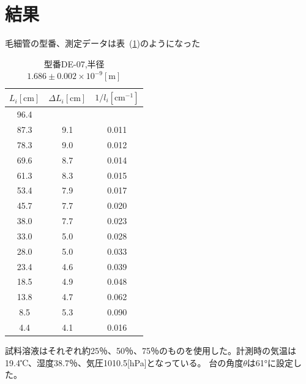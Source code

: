 \documentclass[a4j,10pt]{jarticle}
\newcommand{\Tabref}[1]{表~(\ref{#1})}
\begin{document}
\section{結果}
毛細管の型番、測定データは\Tabref{mousai}のようになった
\begin{table}[h]
\caption{型番DE-07,半径$1.686\pm0.002 \times 10^{-9}[\mathrm m]$}
\label{mousai}
\begin{center}
\begin{tabular}{|c|c|c|}\hline
$L_i\mathrm{[cm]}$ & $\Delta L_i\mathrm{[cm]}$ & $1/l_i\mathrm{[cm^{-1}]}$ \\ \hline \hline
96.4& & \\ \hline
87.3& 9.1& 0.011 \\ \hline
78.3& 9.0& 0.012 \\ \hline
69.6& 8.7& 0.014 \\ \hline
61.3& 8.3& 0.015 \\ \hline
53.4& 7.9& 0.017 \\ \hline
45.7& 7.7& 0.020 \\ \hline
38.0& 7.7& 0.023 \\ \hline
33.0& 5.0& 0.028 \\ \hline
28.0& 5.0& 0.033 \\ \hline
23.4& 4.6& 0.039 \\ \hline
18.5& 4.9& 0.048 \\ \hline
13.8& 4.7& 0.062 \\ \hline
8.5& 5.3& 0.090 \\ \hline
4.4& 4.1& 0.016 \\ \hline
\end{tabular}
\end{center}
\end{table}
試料溶液はそれぞれ約25％、50％、75％のものを使用した。計測時の気温は19.4℃、湿度38.7％、気圧1010.5[hPa]となっている。
台の角度$\theta$は61°に設定した。
\end{document}

